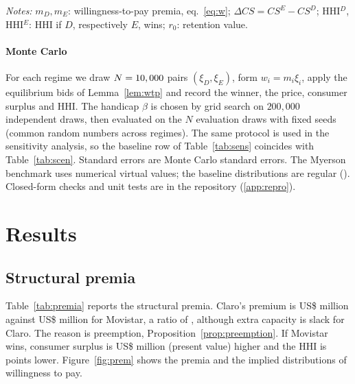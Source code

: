 \documentclass[12pt,a4paper]{article}
\theoremstyle{definition}
\theoremstyle{remark}
\newcommand{\us}{US\$}
\begin{document}
\begin{table}[!htbp]
\centering\small
\caption{Structural premia and market-structure effects (US\$ million, present value)}\label{tab:premia}

\par\vspace{2pt}\footnotesize\textit{Notes:} $m_D,m_E$: willingness-to-pay premia, eq.~\eqref{eq:w}; $\Delta CS=CS^E-CS^D$; HHI$^{D}$, HHI$^{E}$: HHI if $D$, respectively $E$, wins; $r_0$: retention value.
\end{table}

\paragraph{Monte Carlo} For each regime we draw $N=10,000{}$ pairs $(\xi_D,\xi_E)$, form $w_i=m_i\xi_i$, apply the equilibrium bids of Lemma~\ref{lem:wtp} and record the winner, the price, consumer surplus and HHI. The handicap $\beta$ is chosen by grid search on $200{,}000$ independent draws, then evaluated on the $N$ evaluation draws with fixed seeds (common random numbers across regimes). The same protocol is used in the sensitivity analysis, so the baseline row of Table~\ref{tab:sens} coincides with Table~\ref{tab:scen}. Standard errors are Monte Carlo standard errors. The Myerson benchmark uses numerical virtual values; the baseline distributions are regular (\regular). Closed-form checks and unit tests are in the repository (\ref{app:repro}).

\section{Results}\label{sec:results}

\subsection{Structural premia}

Table~\ref{tab:premia} reports the structural premia. Claro's premium is \us\mD{} million against \us\mE{} million for Movistar, a ratio of \mDoverE{}, although extra capacity is slack for Claro. The reason is preemption, Proposition~\ref{prop:preemption}. If Movistar wins, consumer surplus is \us\dCS{} million (present value) higher and the HHI is \dHHI{} points lower. Figure~\ref{fig:prem} shows the premia and the implied distributions of willingness to pay.
\end{document}

